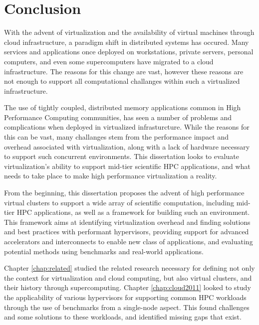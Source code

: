 
\chapter{Conclusion}
\label{chap:conc}

With the advent of virtualization and the availability of virtual machines through cloud infrastructure, a paradigm shift in distributed systems has occured. Many services and applications once deployed on workstations, private servers, personal computers, and even some supercomputers have migrated to a cloud infrastructure. The reasons for this change are vast, however these reasons are not enough to support all computational challanges within such a virtualized infrastructure.

The use of tightly coupled, distributed memory applications common in High Performance Computing communities, has seen a number of problems and complications when deployed in virtualized infrasturcture.  While the reasons for this can be vast, many challanges  stem from the performance impact and overhead associated with virtualization, along with a lack of hardware necessary to support such concurrent environments. This dissertation looks to evaluate virtualization's ability to support mid-tier scientific HPC applications, and what needs to take place to make high performance virtualization a reality.

From the beginning, this dissertation proposes the advent of high performance virtual clusters to support a wide array of scientific computation, including mid-tier HPC applications, as well as a framework for building such an environment. This framework aims at identifying virtualization overhead and finding solutions and best practices with performant hypervisors, providing support for advanced accelerators and interconnects to enable new class of applications, and evaluating potential methods using benchmarks and real-world applications. 


Chapter \ref{chap:related} studied the related research necessary for defining not only the context for virtualization and cloud computing, but also virtual clusters, and their history through supercomputing.  Chapter \ref{chap:cloud2011} looked to study the applicability of various hypervisors for supporting common HPC workloads through the use of benchmarks from a single-node aspect.  This found challenges and some solutions to these workloads, and identified missing gaps that exist. 

